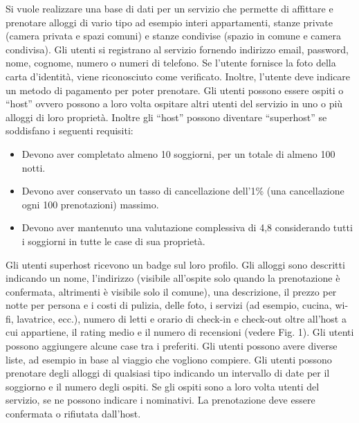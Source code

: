 
Si vuole realizzare una base di dati per un servizio che permette di affittare e prenotare
alloggi di vario tipo ad esempio interi appartamenti, stanze private (camera privata e spazi
comuni) e stanze condivise (spazio in comune e camera condivisa).\newline
Gli utenti si registrano al servizio fornendo indirizzo email, password, nome, cognome,
numero o numeri di telefono. Se l’utente fornisce la foto della carta d’identità, viene
riconosciuto come verificato. Inoltre, l’utente deve indicare un metodo di pagamento per
poter prenotare. Gli utenti possono essere ospiti o “host” ovvero possono a loro volta
ospitare altri utenti del servizio in uno o più alloggi di loro proprietà. Inoltre gli “host” possono
diventare “superhost” se soddisfano i seguenti requisiti:
\begin{itemize}
    \item Devono aver completato almeno 10 soggiorni, per un totale di almeno 100 notti.
    \item Devono aver conservato un tasso di cancellazione dell'1\% (una cancellazione ogni
    100 prenotazioni) massimo.
    \item Devono aver mantenuto una valutazione complessiva di 4,8 \newline considerando tutti i
    soggiorni in tutte le case di sua proprietà.
\end{itemize}
Gli utenti superhost ricevono un badge sul loro profilo.
\newline
\newline
Gli alloggi sono descritti indicando un nome, l’indirizzo (visibile all’ospite solo quando la
prenotazione è confermata, altrimenti è visibile solo il comune), una descrizione, il prezzo per
notte per persona e i costi di pulizia, delle foto, i servizi (ad esempio, cucina, wi-fi, lavatrice,
ecc.), numero di letti e orario di check-in e check-out oltre all’host a cui appartiene, il rating
medio e il numero di recensioni (vedere Fig. 1).
\newline
\newline
Gli utenti possono aggiungere alcune case tra i preferiti. Gli utenti possono avere diverse
liste, ad esempio in base al viaggio che vogliono compiere.
\newline
\newline
Gli utenti possono prenotare degli alloggi di qualsiasi tipo indicando un intervallo di date per il
soggiorno e il numero degli ospiti. Se gli ospiti sono a loro volta utenti del servizio, se ne
possono indicare i nominativi. La prenotazione deve essere confermata o rifiutata dall’host.
